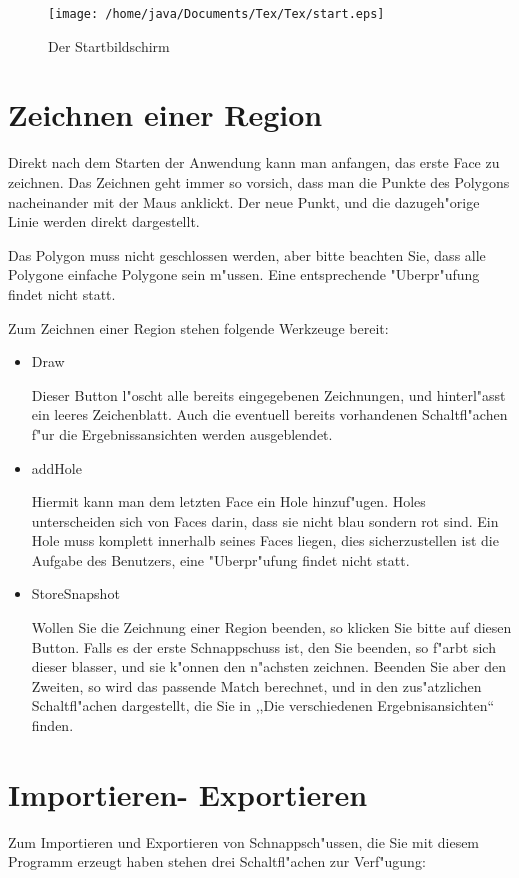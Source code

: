 \begin{figure}
   \centering
   \texttt{[image: /home/java/Documents/Tex/Tex/start.eps]}
   \caption{Der Startbildschirm}
   \label{fig:start}
\end{figure}

\section{Zeichnen einer Region}
\setcounter{section}{1}
Direkt nach dem Starten der Anwendung kann man anfangen, das erste Face zu zeichnen.  Das Zeichnen geht immer so vorsich, dass man die Punkte des Polygons nacheinander mit der Maus anklickt. Der neue Punkt, und die dazugeh"orige Linie werden direkt dargestellt. 

Das Polygon muss nicht geschlossen werden, aber bitte beachten Sie, dass alle Polygone einfache Polygone sein m"ussen. Eine entsprechende "Uberpr"ufung findet nicht statt.

Zum Zeichnen einer Region stehen folgende Werkzeuge bereit:
\begin{itemize}
\item Draw

Dieser Button l"oscht alle bereits eingegebenen Zeichnungen, und hinterl"asst ein leeres Zeichenblatt. Auch die eventuell bereits vorhandenen Schaltfl"achen f"ur die Ergebnissansichten werden ausgeblendet.
\item addHole

Hiermit kann man dem letzten Face ein Hole hinzuf"ugen. Holes unterscheiden sich von Faces darin, dass sie nicht blau sondern rot sind. Ein Hole muss komplett innerhalb seines Faces liegen, dies sicherzustellen ist die Aufgabe des Benutzers, eine "Uberpr"ufung findet nicht statt.
\item StoreSnapshot

Wollen Sie die Zeichnung einer Region beenden, so klicken Sie bitte auf diesen Button. Falls es der erste Schnappschuss ist, den Sie beenden, so f"arbt sich dieser blasser, und sie k"onnen den n"achsten zeichnen. Beenden Sie aber den Zweiten, so wird das passende Match berechnet, und in den zus"atzlichen Schaltfl"achen dargestellt, die Sie in ,,Die verschiedenen Ergebnisansichten`` finden.
\end{itemize} 
\section{Importieren- Exportieren}
Zum Importieren und Exportieren von Schnappsch"ussen, die Sie mit diesem Programm erzeugt haben stehen drei Schaltfl"achen zur Verf"ugung:


